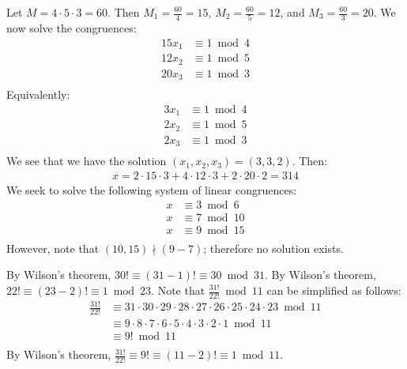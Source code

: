 \documentclass{article}
\begin{document}
Let $M = 4 \cdot 5 \cdot 3 = 60$. Then $M_1 = \frac{60}{4} = 15$, $M_2 = \frac{60}{5} = 12$, and $M_3 = \frac{60}{3} = 20$. We now solve the congruences:
\begin{align*}
    15x_1 & \equiv 1 \bmod 4 \\
    12x_2 & \equiv 1 \bmod 5 \\
    20x_3 & \equiv 1 \bmod 3 \\
\end{align*}
Equivalently:
\begin{align*}
    3x_1 & \equiv 1 \bmod 4 \\
    2x_2 & \equiv 1 \bmod 5 \\
    2x_3 & \equiv 1 \bmod 3 \\  
\end{align*}
We see that we have the solution $(x_1, x_2, x_3) = (3, 3, 2)$. Then:
\begin{align*}
    x = 2 \cdot 15 \cdot 3 + 4 \cdot 12 \cdot 3 + 2 \cdot 20 \cdot 2 = 314
\end{align*}
We seek to solve the following system of linear congruences:
\begin{align*}
    x & \equiv 3 \bmod 6 \\
    x & \equiv 7 \bmod 10 \\
    x & \equiv 9 \bmod 15 \\
\end{align*}
However, note that $(10, 15) \nmid (9 - 7)$; therefore no solution exists.

\clearpage
\problem{}
By Wilson's theorem, $30! \equiv (31 - 1)! \equiv 30 \bmod 31$.
By Wilson's theorem, $22! \equiv (23 - 2)! \equiv 1 \bmod 23$.
Note that $\frac{31!}{22!} \bmod 11$ can be simplified as follows:
\begin{align*}
    \frac{31!}{22!} & \equiv 31 \cdot 30 \cdot 29 \cdot 28 \cdot 27 \cdot 26 \cdot 25 \cdot 24 \cdot 23 \bmod 11 \\
    & \equiv 9 \cdot 8 \cdot 7 \cdot 6 \cdot 5 \cdot 4 \cdot 3 \cdot 2 \cdot 1 \bmod 11 \\
    & \equiv 9! \bmod 11 \\
\end{align*}
By Wilson's theorem, $\frac{31!}{22!} \equiv 9! \equiv (11 - 2)! \equiv 1 \bmod 11$.
\end{document}
